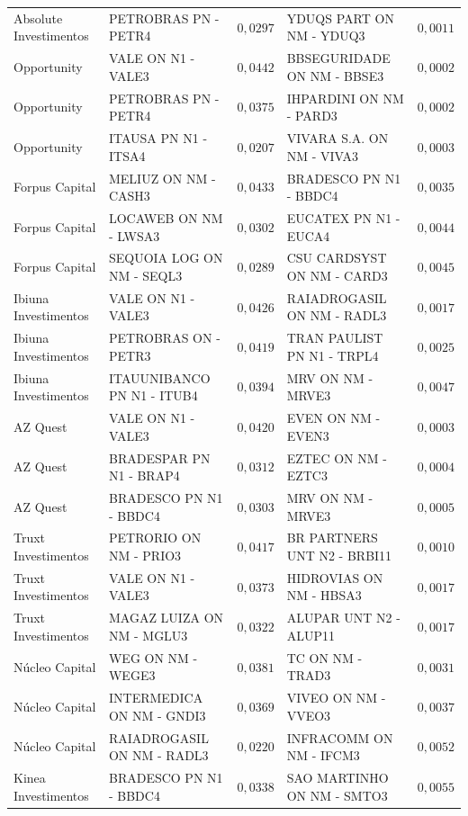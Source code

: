 \documentclass[11pt,a4paper]{article}
\begin{document}
\begin{center}
\begin{longtable}{@{}lp{3.9cm}rp{3.9cm}r@{}}
Absolute Investimentos & PETROBRAS PN - PETR4 & $0{,}0297$ & YDUQS PART ON NM - YDUQ3 & $0{,}0011$ \\
Opportunity & VALE ON N1 - VALE3 & $0{,}0442$ & BBSEGURIDADE ON NM - BBSE3 & $0{,}0002$ \\
Opportunity & PETROBRAS PN - PETR4 & $0{,}0375$ & IHPARDINI ON NM - PARD3 & $0{,}0002$ \\
Opportunity & ITAUSA PN N1 - ITSA4 & $0{,}0207$ & VIVARA S.A. ON NM - VIVA3 & $0{,}0003$ \\
Forpus Capital & MELIUZ ON NM - CASH3 & $0{,}0433$ & BRADESCO PN N1 - BBDC4 & $0{,}0035$ \\
Forpus Capital & LOCAWEB ON NM - LWSA3 & $0{,}0302$ & EUCATEX PN N1 - EUCA4 & $0{,}0044$ \\
Forpus Capital & SEQUOIA LOG ON NM - SEQL3 & $0{,}0289$ & CSU CARDSYST ON NM - CARD3 & $0{,}0045$ \\
Ibiuna Investimentos & VALE ON N1 - VALE3 & $0{,}0426$ & RAIADROGASIL ON NM - RADL3 & $0{,}0017$ \\
Ibiuna Investimentos & PETROBRAS ON - PETR3 & $0{,}0419$ & TRAN PAULIST PN N1 - TRPL4 & $0{,}0025$ \\
Ibiuna Investimentos & ITAUUNIBANCO PN N1 - ITUB4 & $0{,}0394$ & MRV ON NM - MRVE3 & $0{,}0047$ \\
AZ Quest & VALE ON N1 - VALE3 & $0{,}0420$ & EVEN ON NM - EVEN3 & $0{,}0003$ \\
AZ Quest & BRADESPAR PN N1 - BRAP4 & $0{,}0312$ & EZTEC ON NM - EZTC3 & $0{,}0004$ \\
AZ Quest & BRADESCO PN N1 - BBDC4 & $0{,}0303$ & MRV ON NM - MRVE3 & $0{,}0005$ \\
Truxt Investimentos & PETRORIO ON NM - PRIO3 & $0{,}0417$ & BR PARTNERS UNT N2 - BRBI11 & $0{,}0010$ \\
Truxt Investimentos & VALE ON N1 - VALE3 & $0{,}0373$ & HIDROVIAS ON NM - HBSA3 & $0{,}0017$ \\
Truxt Investimentos & MAGAZ LUIZA ON NM - MGLU3 & $0{,}0322$ & ALUPAR UNT N2 - ALUP11 & $0{,}0017$ \\
Núcleo Capital & WEG ON NM - WEGE3 & $0{,}0381$ & TC ON NM - TRAD3 & $0{,}0031$ \\
Núcleo Capital & INTERMEDICA ON NM - GNDI3 & $0{,}0369$ & VIVEO ON NM - VVEO3 & $0{,}0037$ \\
Núcleo Capital & RAIADROGASIL ON NM - RADL3 & $0{,}0220$ & INFRACOMM ON NM - IFCM3 & $0{,}0052$ \\
Kinea Investimentos & BRADESCO PN N1 - BBDC4 & $0{,}0338$ & SAO MARTINHO ON NM - SMTO3 & $0{,}0055$ \\

\end{longtable}
\end{center}
\end{document}
